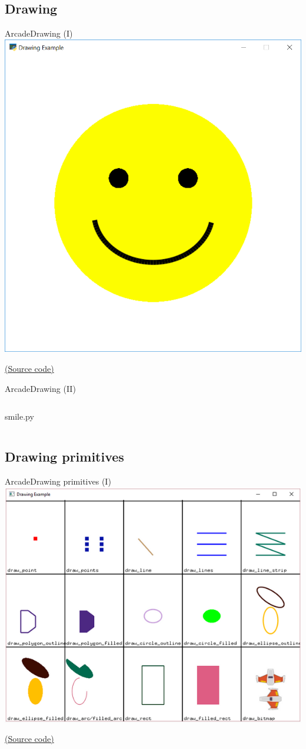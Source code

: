 \documentclass[10pt,compress]{beamer} %
\begin{document}
\subsection{Drawing}

\begin{frame}{Arcade}{Drawing (I)}
	\centering \includegraphics[width=0.5\linewidth]{figs/smile.png}
    \bigskip

    \href{https://api.arcade.academy/en/latest/examples/happy_face.html}{(Source code)}
\end{frame}

\begin{frame}{Arcade}{Drawing (II)}
	\begin{columns}
 	   \column{\textwidth}
		\vspace{-0.2cm}
		\begin{exampleblock}{smile.py}
		\vspace{-0.2cm}
		
		\vspace{-0.2cm}
		\end{exampleblock}
	\end{columns}
\end{frame}

\subsection{Drawing primitives}

\begin{frame}{Arcade}{Drawing primitives (I)}
	\centering \includegraphics[width=0.7\linewidth]{figs/primitives.png} \\
    \bigskip

    \href{https://api.arcade.academy/en/latest/examples/drawing_primitives.html}{(Source code)}
\end{frame}
\end{document}
